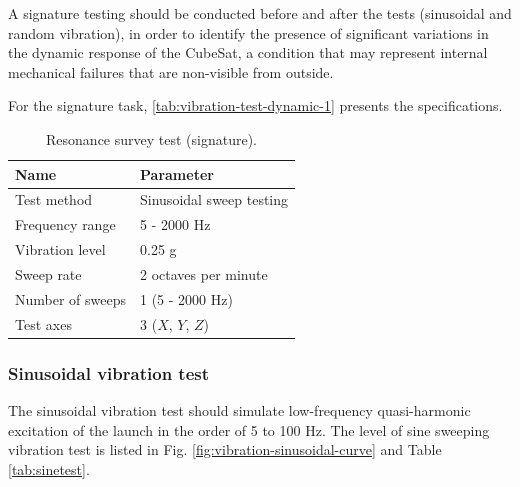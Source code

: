 A signature testing should be conducted before and after the tests (sinusoidal and random vibration), in order to identify the presence of significant variations in the dynamic response of the CubeSat, a condition that may represent internal mechanical failures that are non-visible from outside.

For the signature task, \autoref{tab:vibration-test-dynamic-1} presents the specifications.

\begin{table}[!htb]
    \begin{center}
        \begin{tabular}{ll}
            \toprule[1.5pt]
            \textbf{Name}    & \textbf{Parameter}       \\
            \midrule
            Test method      & Sinusoidal sweep testing \\
            Frequency range  & 5 - 2000 Hz              \\
            Vibration level  & 0.25 g                   \\
            Sweep rate       & 2 octaves per minute     \\
            Number of sweeps & 1 (5 - 2000 Hz)          \\
            Test axes        & 3 ($X$, $Y$, $Z$)        \\
            \bottomrule[1.5pt]
        \end{tabular}
        \caption{Resonance survey test (signature).}
        \label{tab:vibration-test-dynamic-1}
    \end{center}
\end{table}



\subsubsection{Sinusoidal vibration test}

The sinusoidal vibration test should simulate low-frequency quasi-harmonic excitation of the launch in the order of 5 to 100 Hz. The level of sine sweeping vibration test is listed in Fig. \ref{fig:vibration-sinusoidal-curve} and Table \ref{tab:sinetest}.


